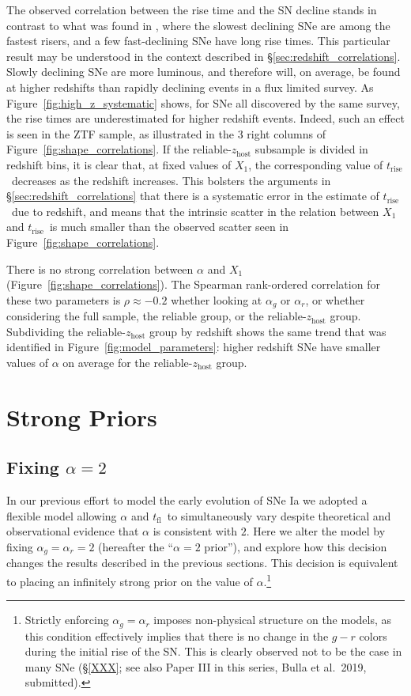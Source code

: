 \documentclass[twocolumn]{./aastex63}
\newcommand{\tfl}{$t_\mathrm{fl}$}
\newcommand{\trise}{$t_\mathrm{rise}$}
\begin{document}
The observed correlation between the rise time and the SN decline stands in
contrast to what was found in \citet{Hayden10}, where the slowest declining SNe
are among the fastest risers, and a few fast-declining SNe have long rise times.
This particular result may be understood in the context described in
\S\ref{sec:redshift_correlations}. Slowly declining SNe are more luminous, and
therefore will, on average, be found at higher redshifts than rapidly declining
events in a flux limited survey. As Figure~\ref{fig:high_z_systematic} shows,
for SNe all discovered by the same survey, the rise times are underestimated for
higher redshift events. Indeed, such an effect is seen in the ZTF sample, as
illustrated in the 3 right columns of Figure~\ref{fig:shape_correlations}. If
the reliable-$z_\mathrm{host}$ subsample is divided in redshift bins, it is
clear that, at fixed values of $X_1$, the corresponding value of \trise\
decreases as the redshift increases. This bolsters the arguments in
\S\ref{sec:redshift_correlations} that there is a systematic error in the
estimate of \trise\ due to redshift, and means that the intrinsic scatter in the
relation between $X_1$ and \trise\ is much smaller than the observed scatter
seen in Figure~\ref{fig:shape_correlations}.

There is no strong correlation between $\alpha$ and $X_1$
(Figure~\ref{fig:shape_correlations}). The Spearman rank-ordered correlation for
these two parameters is $\rho \approx -0.2$ whether looking at $\alpha_g$ or
$\alpha_r$, or whether considering the full sample, the reliable group, or the
reliable-$z_\mathrm{host}$ group. Subdividing the reliable-$z_\mathrm{host}$
group by redshift shows the same trend that was identified in
Figure~\ref{fig:model_parameters}: higher redshift SNe have smaller values of
$\alpha$ on average for the reliable-$z_\mathrm{host}$ group.

\section{Strong Priors}\label{sec:strong_priors}

\subsection{Fixing $\alpha = 2$}

In our previous effort to model the early evolution of SNe Ia we adopted a
flexible model allowing $\alpha$ and \tfl\ to simultaneously vary despite
theoretical \citep{Arnett82,Riess99a} and observational
\citep{Conley06,Hayden10,Ganeshalingam11} evidence that $\alpha$ is consistent
with $2$. Here we alter the model by fixing $\alpha_g = \alpha_r = 2$ (hereafter
the ``$\alpha = 2$ prior''), and explore how this decision changes the results
described in the previous sections. This decision is equivalent to placing an
infinitely strong prior on the value of $\alpha$.\footnote{Strictly enforcing
$\alpha_g = \alpha_r$ imposes non-physical structure on the models, as this
condition effectively implies that there is no change in the $g - r$ colors
during the initial rise of the SN. This is clearly observed not to be the case
in many SNe (\S\ref{XXX}; see also Paper III in this series, Bulla et al.\
2019, submitted). }
\end{document}
